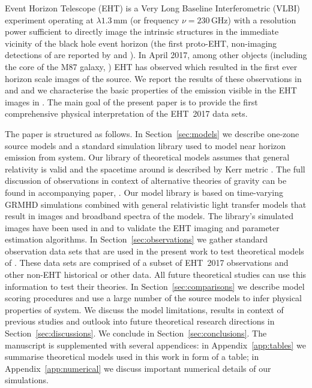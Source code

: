 Event Horizon Telescope (EHT) is a Very Long Baseline Interferometric (VLBI) experiment
operating at $\lambda1.3$\,mm (or frequency $\nu=230$\,GHz)
with a resolution power sufficient to directly image the intrinsic \sgra structures in the immediate vicinity of the black hole event horizon (the first proto-EHT, non-imaging detections of \sgra are reported by \citealt{2008Natur.455...78D, 2015Sci...350.1242J} and \citealt{2018ApJ...859...60L}). In April 2017, among other objects (including the core of the M87 galaxy, ) EHT has observed \sgra which resulted in the first ever horizon scale images of the source. We report the results of these observations in  and  and we characterise the basic properties of the emission visible in the EHT images in . The main goal of the present paper  is to provide the first comprehensive physical interpretation of the EHT~2017 \sgra data sets.

The paper is structured as follows. In Section~\ref{sec:models} we describe one-zone source models and a standard simulation library used to model near horizon emission from \sgra system. Our library of theoretical models assumes that general relativity is valid and the spacetime around \sgra is described by Kerr metric \citep{1963PhRvL..11..237K}. The full discussion of \sgra observations in context of alternative theories of gravity can be found in accompanying paper, .
Our model library is based on time-varying GRMHD simulations combined with general relativistic light transfer models that result in images and broadband spectra of the models. The library's simulated images have been used in  and  to validate the \sgra EHT imaging and parameter estimation algorithms. In Section~\ref{sec:observations} we gather standard observation data sets that are used in the present work to test theoretical models of \sgra. These data sets are comprised of a subset of EHT~2017 observations and other non-EHT historical or other data. All future theoretical studies can use this information to test their theories. 
In Section~\ref{sec:comparisons} we describe model scoring procedures and use a large number of the source models to infer physical properties of \sgra system. We discuss the model limitations, results in context of previous studies and outlook into future \sgra theoretical research directions in Section~\ref{sec:discussions}. We conclude in Section~\ref{sec:conclusions}.
The manuscript is supplemented with several appendices: in Appendix~\ref{app:tables} we summarise theoretical models used in this work in form of a table; in Appendix~\ref{app:numerical} we discuss important numerical details of our simulations.
